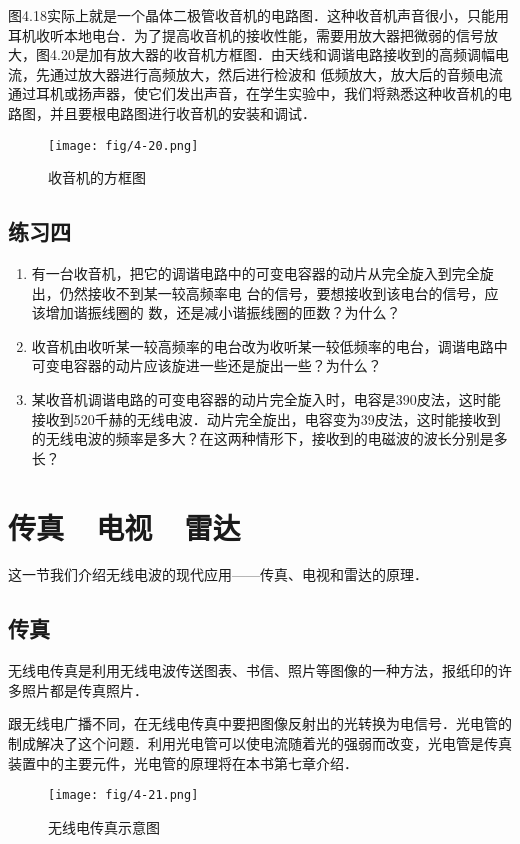 图4.18实际上就是一个晶体二极管收音机的电路图．这种收音机声音很小，只能用耳机收听本地电台．为了提高收音机的接收性能，需要用放大器把微弱的信号放大，图4.20是加有放大器的收音机方框图．由天线和调谐电路接收到的高频调幅电流，先通过放大器进行高频放大，然后进行检波和
低频放大，放大后的音频电流通过耳机或扬声器，使它们发出声音，在学生实验中，我们将熟悉这种收音机的电路图，并且要根电路图进行收音机的安装和调试．
\begin{figure}[htp]\centering
\texttt{[image: fig/4-20.png]}
\caption{收音机的方框图}
\end{figure}


\subsection*{练习四}
\begin{enumerate}
	\item 有一台收音机，把它的调谐电路中的可变电容器的动片从完全旋入到完全旋出，仍然接收不到某一较高频率电
	台的信号，要想接收到该电台的信号，应该增加谐振线圈的
	数，还是减小谐振线圈的匝数？为什么？
	\item 收音机由收听某一较高频率的电台改为收听某一较低频率的电台，调谐电路中可变电容器的动片应该旋进一些还是旋出一些？为什么？
	\item 某收音机调谐电路的可变电容器的动片完全旋入时，电容是390皮法，这时能接收到520千赫的无线电波．动片完全旋出，电容变为39皮法，这时能接收到的无线电波的频率是多大？在这两种情形下，接收到的电磁波的波长分别是多长？
\end{enumerate}

\section{传真~~电视~~雷达}
这一节我们介绍无线电波的现代应用——传真、电视和雷达的原理．

\subsection{传真}

无线电传真是利用无线电波传送图表、书信、照片等图像的一种方法，报纸印的许多照片都是传真照片．

跟无线电广播不同，在无线电传真中要把图像反射出的光转换为电信号．光电管的制成解决了这个问题．利用光电管可以使电流随着光的强弱而改变，光电管是传真装置中的主要元件，光电管的原理将在本书第七章介绍．
\begin{figure}[htp]\centering
	\texttt{[image: fig/4-21.png]}
	\caption{无线电传真示意图}
	\end{figure}

